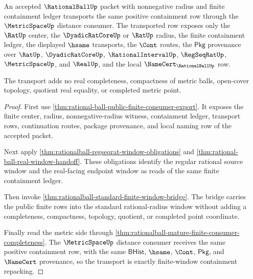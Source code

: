 \begin{theorem}
\label{thm:rationalball-metric-positive-containment-transport}
An accepted $\RationalBallUp$ packet with nonnegative radius and finite
containment ledger transports the same positive containment row through the
$\MetricSpaceUp$ distance consumer. The transported row exposes only the
$\RatUp$ center, the $\DyadicRatCoreUp$ or $\RatUp$ radius, the finite
containment ledger, the displayed $\hsame$ transports, the $\Cont$ routes, the
$\mathsf{Pkg}$ provenance over $\RatUp$, $\DyadicRatCoreUp$,
$\RationalIntervalUp$, $\RegSeqRatUp$, $\MetricSpaceUp$, and $\RealUp$, and the
local $\NameCert_{\RationalBallUp}$ row.

The transport adds no real completeness, compactness of metric balls,
open-cover topology, quotient real equality, or completed metric point.
\end{theorem}
\begin{proof}
First use \autoref{thm:rational-ball-public-finite-consumer-export}. It exposes
the finite center, radius, nonnegative-radius witness, containment ledger,
transport rows, continuation routes, package provenance, and local naming row
of the accepted packet.

Next apply \autoref{thm:rationalball-regseqrat-window-obligations} and
\autoref{thm:rational-ball-real-window-handoff}. These obligations identify the
regular rational source window and the real-facing endpoint window as reads of
the same finite containment ledger.

Then invoke \autoref{thm:rationalball-standard-finite-window-bridge}. The
bridge carries the public finite rows into the standard rational-radius window
without adding a completeness, compactness, topology, quotient, or completed
point coordinate.

Finally read the metric side through
\autoref{thm:rationalball-mature-finite-consumer-completeness}. The
$\MetricSpaceUp$ distance consumer receives the same positive containment row,
with the same $\mathsf{BHist}$, $\hsame$, $\Cont$, $\mathsf{Pkg}$, and
$\NameCert$ provenance, so the transport is exactly finite-window containment
repacking.
\end{proof}

